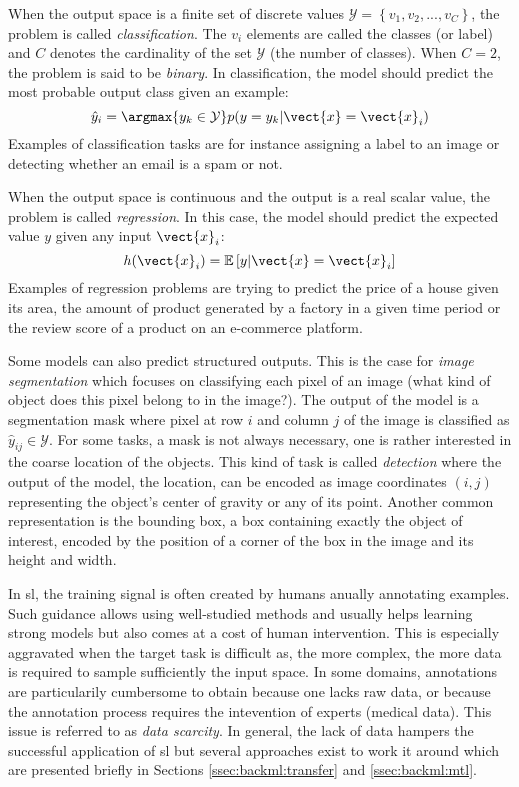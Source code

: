 When the output space is a finite set of discrete values $\mathcal{Y} = \left\{v_1, v_2, ..., v_C\right\}$, the problem is called \textit{classification}. The $v_i$ elements are called the classes (or label) and $C$ denotes the cardinality of the set $\mathcal{Y}$ (\ie the number of classes). When $C = 2$, the problem is said to be \textit{binary}. In classification, the model should predict the most probable output class given an example:
\begin{equation}
\hat{y}_i = \argmax{y_k \in \mathcal{Y}} p(y=y_k|\vect{x}=\vect{x}_i)
\end{equation}
Examples of classification tasks are for instance assigning a label to an image or detecting whether an email is a spam or not. 

When the output space is continuous and the output is a real scalar value, the problem is called \textit{regression}. In this case, the model should predict the expected value $y$ given any input $\vect{x}_i$:
\begin{equation}
h(\vect{x}_i) = \mathbb{E}\left[y|\vect{x}=\vect{x}_i\right]
\end{equation}
Examples of regression problems are trying to predict the price of a house given its area, the amount of product generated by a factory in a given time period or the review score of a product on an e-commerce platform. 

Some models can also predict structured outputs. This is the case for \textit{image segmentation} which focuses on classifying each pixel of an image (\ie what kind of object does this pixel belong to in the image?). The output of the model is a segmentation mask where pixel at row $i$ and column $j$ of the image is classified as $\hat{y}_{ij} \in \mathcal{Y}$. For some tasks, a mask is not always necessary, one is rather interested in the coarse location of the objects. This kind of task is called \textit{detection} where the output of the model, the location, can be encoded as image coordinates $(i, j)$ representing the object's center of gravity or any of its point. Another common representation is the bounding box, a box containing exactly the object of interest, encoded by the position of a corner of the box in the image and its height and width.

In \acrlong{sl}, the training signal is often created by humans anually annotating examples. Such guidance allows using well-studied methods and usually helps learning strong models but also comes at a cost of human intervention. This is especially aggravated when the target task is difficult as, the more complex, the more data is required to sample sufficiently the input space. In some domains, annotations are particularily cumbersome to obtain because one lacks raw data, or because the annotation process requires the intevention of experts (\eg medical data). This issue is referred to as \textit{data scarcity}. In general, the lack of data hampers the successful application of \acrlong{sl} but several approaches exist to work it around which are presented briefly in Sections \ref{ssec:backml:transfer} and \ref{ssec:backml:mtl}. 

